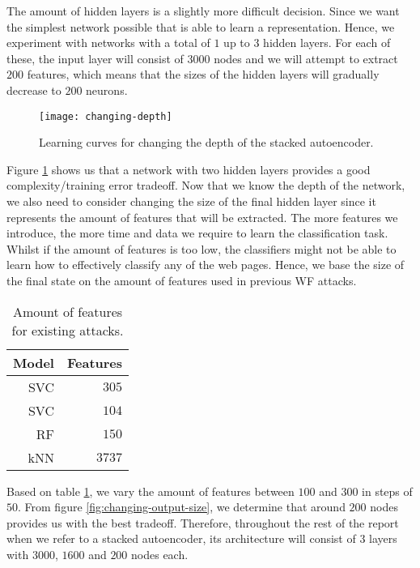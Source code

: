 The amount of hidden layers is a slightly more difficult decision.
Since we want the simplest network possible that is able to learn a representation.
Hence, we experiment with networks with a total of $1$ up to $3$ hidden layers.
For each of these, the input layer will consist of $3000$ nodes and we will attempt to extract $200$ features, which means that the sizes of the hidden layers will gradually decrease to $200$ neurons.

\begin{figure}[ht]
  \centering
  \texttt{[image: changing-depth]}
  \caption{Learning curves for changing the depth of the stacked autoencoder.}
  \label{fig:changing-depth}
\end{figure}

Figure \ref{fig:changing-depth} shows us that a network with two hidden layers provides a good complexity/training error tradeoff.
Now that we know the depth of the network, we also need to consider changing the size of the final hidden layer since it represents the amount of features that will be extracted.
The more features we introduce, the more time and data we require to learn the classification task.
Whilst if the amount of features is too low, the classifiers might not be able to learn how to effectively classify any of the web pages.
Hence, we base the size of the final state on the amount of features used in previous WF attacks.

\begin{table}[ht]
  \centering
  \begin{tabular}{ r r } \hline
    \multicolumn{1}{c}{\textbf{Model}} & \multicolumn{1}{c}{\textbf{Features}} \\ \hline
    SVC \cite{panchenko1} & $305$ \\
    SVC \cite{panchenko2} & $104$ \\
    RF \cite{kfingerprinting} & $150$ \\
    kNN \cite{wang_cai_johnson_nithyanand_goldberg_2014} & $3737$ \\
    \hline
  \end{tabular}
  \caption{Amount of features for existing attacks.}
  \label{table:feature-wf-attacks}
\end{table}

Based on table \ref{table:feature-wf-attacks}, we vary the amount of features between $100$ and $300$ in steps of $50$.
From figure \ref{fig:changing-output-size}, we determine that around $200$ nodes provides us with the best tradeoff.
Therefore, throughout the rest of the report when we refer to a stacked autoencoder, its architecture will consist of $3$ layers with $3000$, $1600$ and $200$ nodes each.

